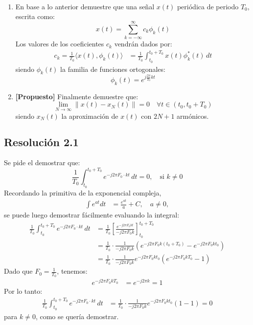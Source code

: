 \documentclass[
  11pt,
  letterpaper,
   addpoints,
   answers
  ]{exam}
\begin{document}
\begin{questions}
\begin{enumerate}
  \item En base a lo anterior demuestre que una señal $x(t)$ periódica de periodo $T_0$, escrita como:
  \begin{equation}
    x(t) = \sum_{k=-\infty}^{\infty} c_k \phi_{k}(t)
  \end{equation}
Los valores de los coeficientes $c_k$ vendrán dados por:
\begin{align}
  c_{k} = \frac{1}{T_0} \langle x(t), \phi_k(t) \rangle &= \frac{1}{T_0} \int_{t_0}^{t_0+T_0} x(t) \phi_k^{*}(t) \, dt
\end{align}
  siendo $\phi_k(t)$ la familia de funciones ortogonales:
  \begin{equation}
    \phi_k(t) = e^{j \frac{2\pi}{T_0} k t}
  \end{equation}
  \item \textbf{[Propuesto]} Finalmente demuestre que:
  \begin{equation}
    \lim_{N \to \infty} \| x(t) - x_N(t) \| = 0 \quad \forall t \in (t_0 , t_0+T_0)
  \end{equation}
  siendo $x_N(t)$ la aproximación de $x(t)$ con $2N+1$ armónicos.
\end{enumerate}
\begin{solution}
\subsection*{Resolución 2.1}
Se pide el demostrar que:
\begin{equation}
\frac{1}{T_0} \int_{t_0}^{t_0+T_0} e^{-j 2\pi F_0 \cdot k t} \, dt = 0, \quad \text{si } k \neq 0
\end{equation}
Recordando la primitiva de la exponencial compleja, 
\begin{align}
\int e^{at} dt &= \frac{e^{at}}{a} + C, \quad a \neq 0,
\end{align} 
se puede luego demostrar fácilmente evaluando la integral:
\begin{align}
\frac{1}{T_0} \int_{t_0}^{t_0+T_0} e^{-j 2\pi F_0 \cdot k t} \, dt
&= \frac{1}{T_0} \left[ \frac{e^{-j 2\pi F_0 k t}}{-j 2\pi F_0 k} \right]_{t_0}^{t_0+T_0} \\
&= \frac{1}{T_0} \cdot \frac{1}{-j 2\pi F_0 k} \left( e^{-j 2\pi F_0 k (t_0 + T_0)} - e^{-j 2\pi F_0 k t_0} \right) \\
&= \frac{1}{T_0} \cdot \frac{1}{-j 2\pi F_0 k} e^{-j 2\pi F_0 k t_0} \left( e^{-j 2\pi F_0 k T_0} - 1 \right)
\end{align}
Dado que \(F_0 = \frac{1}{T_0}\), tenemos:
\begin{align}
e^{-j 2\pi F_0 k T_0} &= e^{-j 2\pi k} = 1
\end{align}
Por lo tanto:
\begin{align}
\frac{1}{T_0} \int_{t_0}^{t_0+T_0} e^{-j 2\pi F_0 \cdot k t} \, dt &= \frac{1}{T_0} \cdot \frac{1}{-j 2\pi F_0 k} e^{-j 2\pi F_0 k t_0} (1 - 1) = 0
\end{align}
para \(k \neq 0\), como se quería demostrar.

\end{solution}
\end{questions}
\end{document}
